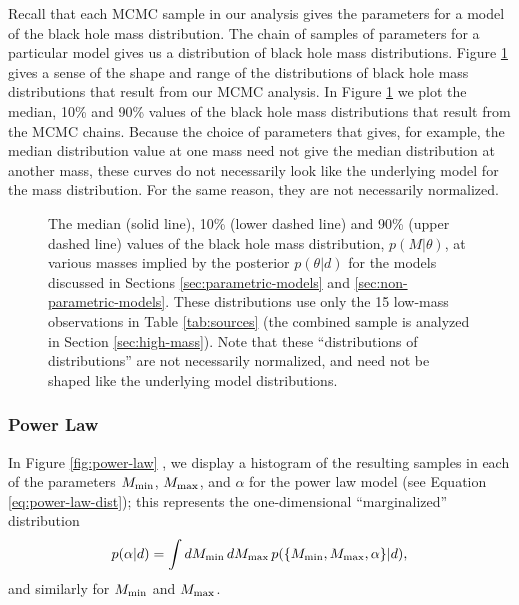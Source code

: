 \documentclass[preprint]{aastex}
\newcommand{\Mmin}{M_{\textnormal{min}}}
\newcommand{\Mmax}{M_{\textnormal{max}}}
\begin{document}
Recall that each MCMC sample in our analysis gives the parameters for
a model of the black hole mass distribution.  The chain of samples of
parameters for a particular model gives us a distribution of black
hole mass distributions.  Figure \ref{fig:dists} gives a sense of the
shape and range of the distributions of black hole mass distributions
that result from our MCMC analysis.  In Figure \ref{fig:dists} we plot
the median, 10\% and 90\% values of the black hole mass distributions
that result from the MCMC chains.  Because the choice of parameters
that gives, for example, the median distribution value at one mass
need not give the median distribution at another mass, these curves do
not necessarily look like the underlying model for the mass
distribution.  For the same reason, they are not necessarily
normalized.

\begin{figure}
  \begin{center}
  \end{center}
  \caption{\label{fig:dists} The median (solid line), 10\% (lower
    dashed line) and 90\% (upper dashed line) values of the black hole
    mass distribution, $p(M|\theta)$, at various masses implied by the
    posterior $p(\theta|d)$ for the models discussed in Sections
    \ref{sec:parametric-models} and \ref{sec:non-parametric-models}.
    These distributions use only the 15 low-mass observations in Table
    \ref{tab:sources} (the combined sample is analyzed in Section
    \ref{sec:high-mass}).  Note that these ``distributions of
    distributions'' are not necessarily normalized, and need not be
    shaped like the underlying model distributions.}
\end{figure}

\subsubsection{Power Law}

In Figure \ref{fig:power-law} , we display a histogram of the
resulting samples in each of the parameters $\Mmin$, $\Mmax$, and
$\alpha$ for the power law model (see Equation
\eqref{eq:power-law-dist}); this represents the one-dimensional
``marginalized'' distribution
\begin{equation}
  \label{eq:alpha-pdf}
  p(\alpha|d) = \int d\Mmin\, d\Mmax\, p(\{\Mmin, \Mmax, \alpha\}|d),
\end{equation}
and similarly for $\Mmin$ and $\Mmax$.
\end{document}
